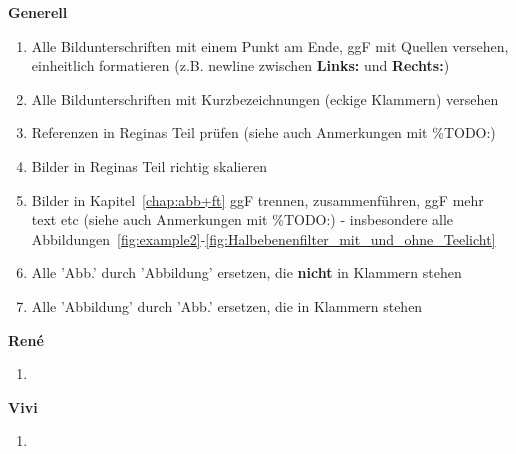 
\textbf{Generell}
\begin{enumerate}
	\item Alle Bildunterschriften mit einem Punkt am Ende, ggF mit Quellen versehen, einheitlich formatieren (z.B. newline zwischen \textbf{Links:} und \textbf{Rechts:})
	\item Alle Bildunterschriften mit Kurzbezeichnungen (eckige Klammern) versehen
	\item Referenzen in Reginas Teil prüfen (siehe auch Anmerkungen mit \%TODO:)
	\item Bilder in Reginas Teil richtig skalieren
	\item Bilder in Kapitel~\ref{chap:abb+ft} ggF trennen, zusammenführen, ggF mehr text etc (siehe auch Anmerkungen mit \%TODO:) - insbesondere alle Abbildungen~\ref{fig:example2}-\ref{fig:Halbebenenfilter_mit_und_ohne_Teelicht}
	\item Alle 'Abb.' durch 'Abbildung' ersetzen, die \textbf{nicht} in Klammern stehen
	\item Alle 'Abbildung' durch 'Abb.' ersetzen, die in Klammern stehen
\end{enumerate}

\textbf{René}
\begin{enumerate}
	\item 
\end{enumerate}

\textbf{Vivi}
\begin{enumerate}
	\item 
\end{enumerate}